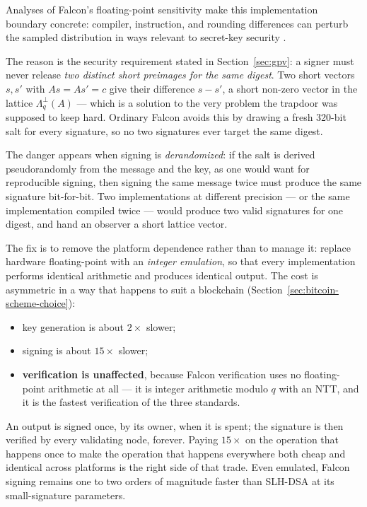 Analyses of Falcon's floating-point sensitivity make this implementation boundary
concrete: compiler, instruction, and rounding differences can perturb the sampled
distribution in ways relevant to secret-key security \cite{sleepingfalcon2025}.

The reason is the security requirement stated in Section~\ref{sec:gpv}: a signer must
never release \emph{two distinct short preimages for the same digest}. Two short
vectors $s, s'$ with $As = As' = c$ give their difference $s - s'$, a short
non-zero vector in the lattice $\Lambda^{\perp}_q(A)$ --- which is a solution to
the very problem the trapdoor was supposed to keep hard. Ordinary Falcon avoids
this by drawing a fresh 320-bit salt for every signature, so no two signatures
ever target the same digest.

The danger appears when signing is \emph{derandomized}: if the salt is derived
pseudorandomly from the message and the key, as one would want for reproducible
signing, then signing the same message twice must produce the same signature
bit-for-bit. Two implementations at different precision --- or the same
implementation compiled twice --- would produce two valid signatures for one
digest, and hand an observer a short lattice vector.

The fix is to remove the platform dependence rather than to manage it: replace
hardware floating-point with an \emph{integer emulation}, so that every
implementation performs identical arithmetic and produces identical output. The
cost is asymmetric in a way that happens to suit a blockchain
(Section~\ref{sec:bitcoin-scheme-choice}):

\begin{itemize}
  \item key generation is about $2\times$ slower;
  \item signing is about $15\times$ slower;
  \item \textbf{verification is unaffected}, because Falcon verification uses no
        floating-point arithmetic at all --- it is integer arithmetic modulo $q$
        with an NTT, and it is the fastest verification of the three standards.
\end{itemize}

An output is signed once, by its owner, when it is spent; the signature is then
verified by every validating node, forever. Paying $15\times$ on the operation
that happens once to make the operation that happens everywhere both cheap and
identical across platforms is the right side of that trade. Even emulated,
Falcon signing remains one to two orders of magnitude faster than SLH-DSA at its
small-signature parameters.

